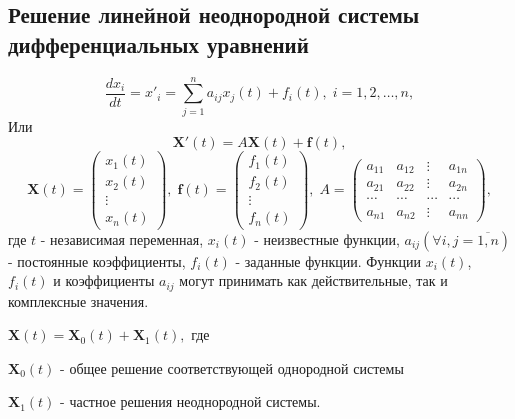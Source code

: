 \documentclass[a5paper,10pt]{article}
\begin{document}
		\subsection{Решение линейной неоднородной системы дифференциальных уравнений}
			$$ \frac{dx_i}{dt} = x\prime_i = \sum\limits_{j=1}^n a_{ij}x_j(t) + f_i(t), \; i = 1,2,\ldots,n, $$
			Или
			$$ \mathbf{X}'\left( t \right) = A\mathbf{X}\left( t \right) + \mathbf{f}\left( t \right), $$
			\begin{equation}
				\mathbf{X}\left( t \right) = \left(
					\begin{array}{*{20}{c}}
						{{x_1}\left( t \right)}\\
						{{x_2}\left( t \right)}\\
						 \vdots \\
						{{x_n}\left( t \right)}
					\end{array}
				\right), \;
				\mathbf{f}\left( t \right) = \left(
					\begin{array}{*{20}{c}}
						{{f_1}\left( t \right)}\\
						{{f_2}\left( t \right)}\\
						 \vdots \\
						{{f_n}\left( t \right)}
					\end{array}
				\right), \;
				A = \left(
					\begin{array}{*{20}{c}}
						{{a_{11}}}&{{a_{12}}}& \vdots &{{a_{1n}}}\\
						{{a_{21}}}&{{a_{22}}}& \vdots &{{a_{2n}}}\\
						 \cdots & \cdots & \cdots & \cdots \\
						{{a_{n1}}}&{{a_{n2}}}& \vdots &{{a_{nn}}}
					\end{array}
				\right),
			\end{equation}
			где $t$ - независимая переменная, $x_i(t)$ - неизвестные функции, $a_{ij}(\forall i,j=\overline{1,n})$ - постоянные коэффициенты, $f_i(t)$ - заданные функции. Функции $x_i(t)$, $f_i(t)$ и коэффициенты $a_{ij}$ могут принимать как действительные, так и комплексные значения. 
			\begin{framed}
				$ \mathbf{X}\left( t \right) = {\mathbf{X}_0}\left( t \right) + {\mathbf{X}_1}\left( t \right),$ где \par
				$ \mathbf{X}_0(t) $ - общее решение соответствующей однородной системы \par
				$ \mathbf{X}_1(t) $ - частное решения неоднородной системы.
			\end{framed}
\end{document}
